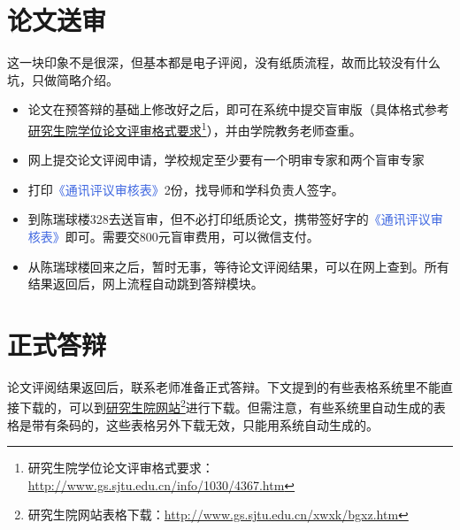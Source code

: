 \documentclass[a4paper, 12pt]{ctexart}
\newcommand{\form}[1]{\textcolor{RoyalBlue}{《#1》}}
\begin{document}
\section{论文送审}
这一块印象不是很深，但基本都是电子评阅，没有纸质流程，故而比较没有什么坑，只做简略介绍。

\begin{itemize}
    \item 论文在预答辩的基础上修改好之后，即可在系统中提交盲审版（具体格式参考\href{http://www.gs.sjtu.edu.cn/info/1030/4367.htm}{研究生院学位论文评审格式要求}\footnote{研究生院学位论文评审格式要求：\url{http://www.gs.sjtu.edu.cn/info/1030/4367.htm}}），并由学院教务老师查重。
    \item 网上提交论文评阅申请，学校规定至少要有一个明审专家和两个盲审专家
    \item 打印\form{通讯评议审核表}2份，找导师和学科负责人签字。
    \item 到陈瑞球楼328去送盲审，但不必打印纸质论文，携带签好字的\form{通讯评议审核表}即可。需要交800元盲审费用，可以微信支付。
    \item 从陈瑞球楼回来之后，暂时无事，等待论文评阅结果，可以在网上查到。所有结果返回后，网上流程自动跳到答辩模块。
\end{itemize}

\section{正式答辩}
论文评阅结果返回后，联系老师准备正式答辩。下文提到的有些表格系统里不能直接下载的，可以到\href{http://www.gs.sjtu.edu.cn/xwxk/bgxz.htm}{研究生院网站}\footnote{研究生院网站表格下载：\url{http://www.gs.sjtu.edu.cn/xwxk/bgxz.htm}}进行下载。但需注意，有些系统里自动生成的表格是带有条码的，这些表格另外下载无效，只能用系统自动生成的。
\end{document}
